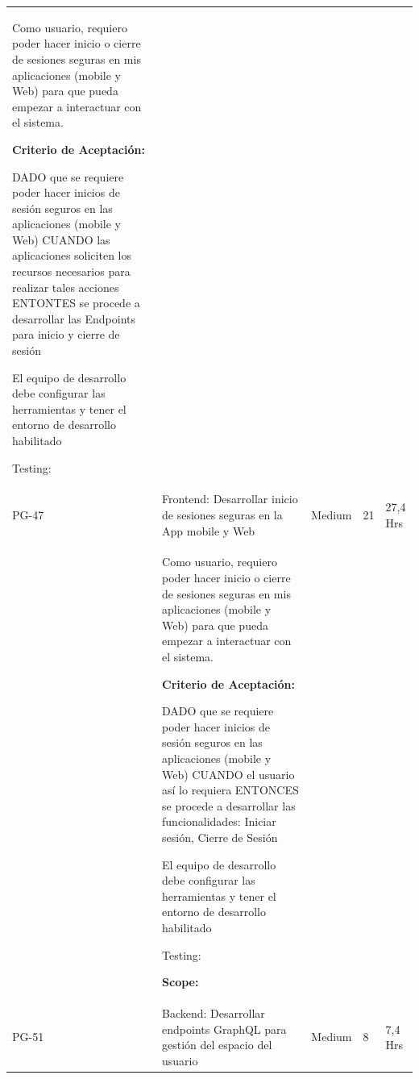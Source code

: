 \documentclass[11pt]{charter}
\begin{document}
\begin{landscape}
\begin{tabularx}{\linewidth}{@{}|p{1.3cm}|p{17cm}|p{1.7cm}|p{1.5cm}|p{1.7cm}|@{}}
\begin{description}
                   \item Como usuario, requiero poder   hacer inicio o cierre de sesiones seguras en mis aplicaciones (mobile y Web)   para que pueda empezar a interactuar con el sistema.                 
                   \item \textbf{Criterio de Aceptación:}                 
                   \item DADO que se requiere poder hacer inicios de sesión seguros en las   aplicaciones (mobile y Web) CUANDO las aplicaciones soliciten los recursos necesarios para realizar   tales acciones ENTONTES se procede a desarrollar las Endpoints para inicio y cierre de   sesión                 
                         \item El equipo de desarrollo debe configurar las herramientas y tener el   entorno de desarrollo habilitado                 
                   \item Testing:                 
            \end{description}            &  &     & \\
PG-47    & Frontend: Desarrollar inicio de   sesiones seguras en la App mobile y Web            & Medium             & 21  & 27,4  Hrs         \\
         &  \begin{description}                 
                   \item Como usuario, requiero poder   hacer inicio o cierre de sesiones seguras en mis aplicaciones (mobile y Web)   para que pueda empezar a interactuar con el sistema.                 
                   \item \textbf{Criterio de Aceptación:}                 
                   \item DADO que se requiere poder hacer inicios de sesión seguros en las   aplicaciones (mobile y Web) CUANDO el usuario así lo requiera ENTONCES se procede a desarrollar las funcionalidades: Iniciar sesión,   Cierre de Sesión
					\item El equipo de desarrollo debe configurar las herramientas y tener el   entorno de desarrollo habilitado                 
                   \item Testing:                 
                   \item \textbf{Scope:}
            \end{description}   &  &     & \\
PG-51    & Backend: Desarrollar endpoints   GraphQL para gestión del espacio del usuario        & Medium             & 8   & 7,4  Hrs          \\

\end{tabularx}
\end{landscape}
\end{document}
